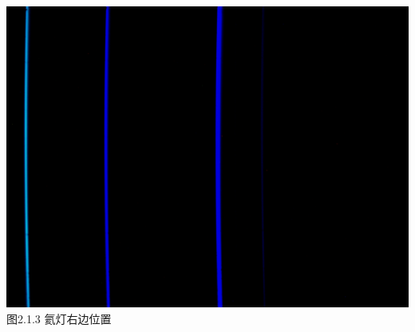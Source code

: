 \documentclass{ctexart}
\begin{document}
\begin{minipage}[c]{0.33\textwidth}
    \includegraphics[scale=0.05]{3-1} \\\small{图2.1.3 氦灯右边位置}\centering
\end{minipage}
\end{document}
